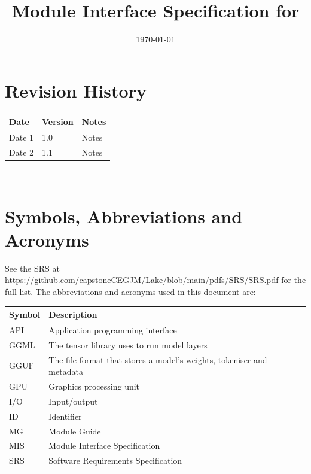 \documentclass[12pt, titlepage]{article}
\begin{document}
\title{Module Interface Specification for \progname{}}

\author{\authname}

\date{\today}

\maketitle


\section{Revision History}

\begin{tabularx}{\textwidth}{p{3cm}p{2cm}X}
\toprule {\bf Date} & {\bf Version} & {\bf Notes}\\
\midrule
Date 1 & 1.0 & Notes\\
Date 2 & 1.1 & Notes\\
\bottomrule
\end{tabularx}

~\newpage

\section{Symbols, Abbreviations and Acronyms}

See the SRS at
\url{https://github.com/capstoneCEGJM/Lake/blob/main/pdfs/SRS/SRS.pdf} for the
full list. The abbreviations and acronyms used in this document are:

\begin{center}
\renewcommand{\arraystretch}{1.2}
\begin{tabular}{l p{11cm}}
\toprule
\textbf{Symbol} & \textbf{Description} \\
\midrule
API & Application programming interface \\
GGML & The tensor library \progname{} uses to run model layers \\
GGUF & The file format that stores a model's weights, tokeniser and metadata \\
GPU & Graphics processing unit \\
I/O & Input/output \\
ID & Identifier \\
MG & Module Guide \\
MIS & Module Interface Specification \\
SRS & Software Requirements Specification \\
\bottomrule
\end{tabular}
\end{center}
\end{document}

